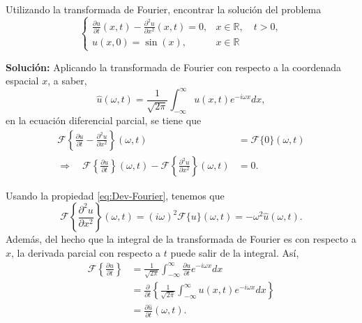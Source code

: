\begin{ejemplo}
    Utilizando la transformada de Fourier, encontrar la solución del problema
    \begin{equation}
        \left\{ \begin{array}{cl}
           {\displaystyle \frac{\partial u}{\partial t}(x,t) - \frac{\partial^2 u}{\partial x^2}(x,t) = 0},  & x \in \mathbb{R}, \quad t > 0,  \\
             u(x,0) = \sin(x), & x \in \mathbb{R} 
        \end{array}\right. 
    \end{equation}

    \textbf{Solución:} Aplicando la transformada de Fourier con respecto a la coordenada espacial $x$, a saber,
    \begin{equation}
        \hat{u}(\omega,t) = \frac{1}{\sqrt{2\pi}} \int_{-\infty}^{\infty} u(x,t) e^{-i\omega x} dx,
    \end{equation}
en la ecuación diferencial parcial, se tiene que
\begin{align}
 \mathcal{F} \left\{ \frac{\partial u}{\partial t} - \frac{\partial^2 u}{\partial x^2} \right\}(\omega,t) &= \mathcal{F}\{0\}(\omega,t) \nonumber \\
\Rightarrow \quad \mathcal{F} \left\{ \frac{\partial u}{\partial t} \right\}(\omega,t) - \mathcal{F}\left\{  \frac{\partial^2 u}{\partial x^2} \right\}(\omega,t) &= 0.  \label{eq:Fourier1}   
\end{align}

Usando la propiedad \eqref{eq:Dev-Fourier}, tenemos que
\begin{equation}
    \mathcal{F}\left\{\frac{\partial^2 u}{\partial x^2}\right\}(\omega,t) = (i\omega)^2 \mathcal{F}\{u\}(\omega,t) = -\omega^2\hat{u}(\omega,t).
\end{equation}
Además, del hecho que la integral de la transformada de Fourier es con respecto a $x$, la derivada parcial con respecto a $t$ puede salir de la integral. Así,
\begin{align}
    \mathcal{F} \left\{ \frac{\partial u}{\partial t} \right\} &= \frac{1}{\sqrt{2\pi}} \int_{-\infty}^{\infty} \frac{\partial u}{\partial t} e^{-i\omega x} dx \nonumber \\
    &= \frac{\partial}{\partial t} \left\{\frac{1}{\sqrt{2\pi}} \int_{-\infty}^{\infty} u(x,t) e^{-i\omega x} dx\right\} \nonumber \\
    &= \frac{\partial\hat{u}}{\partial t}(\omega,t).
\end{align}


\end{ejemplo}
